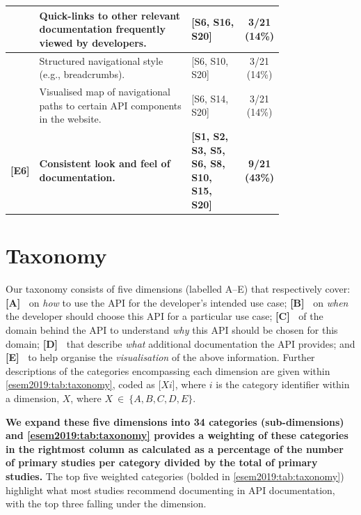 \begin{table}[hbt]
\begin{tabular}{|rp{0.58\linewidth}||p{0.2\linewidth}|c|}
    \hline
    [E3]&
    Quick-links to other relevant documentation frequently viewed by developers.
    &
    [S6, S16, S20] &
    3/21 (14\%)\\

    \hline
    [E4]&
    Structured navigational style (e.g., breadcrumbs).
    &
    [S6, S10, S20] &
    3/21 (14\%)\\

    \hline
    [E5]&
    Visualised map of navigational paths to certain API components in the website.
    &
    [S6, S14, S20] &
    3/21 (14\%)\\

    \hline
    \textbf{[E6]}&
    \textbf{Consistent look and feel of documentation.}
    &
    \textbf{[S1, S2, S3, S5, S6, S8, S10, S15, S20]} &
    \textbf{9/21 (43\%)}\\
    \hline
  \end{tabular}
\end{table}

\section{Taxonomy}
\label{esem2019:sec:findings}

Our taxonomy consists of five dimensions (labelled A--E) that respectively cover:
\textbf{[A]~\dima{}} on \textit{how} to use the API for the developer's intended use case;
\textbf{[B]~\dimb{}} on \textit{when} the developer should choose this API for a particular use case;
\textbf{[C]~\dimc{}} of the domain behind the API to understand \textit{why} this API should be chosen for this domain;
\textbf{[D]~\dimd{}} that describe \textit{what} additional documentation the API provides; and
 \textbf{[E]~\dime{}} to help organise the \textit{visualisation} of the above information.
Further descriptions of the categories encompassing each dimension are given within \cref{esem2019:tab:taxonomy}, coded as [$Xi$], where $i$ is the category identifier within a dimension, $X$, where $X~\in~\{ A, B, C, D, E \}$.

\textbf{We expand these five dimensions into 34 categories (sub-dimensions) and \cref{esem2019:tab:taxonomy} provides a weighting of these categories in the rightmost column as calculated as a percentage of the number of primary studies per category divided by the total of primary studies.} The top five weighted categories (bolded in \cref{esem2019:tab:taxonomy}) highlight what most studies recommend documenting in API documentation, with the top three falling under the \dima{} dimension.

